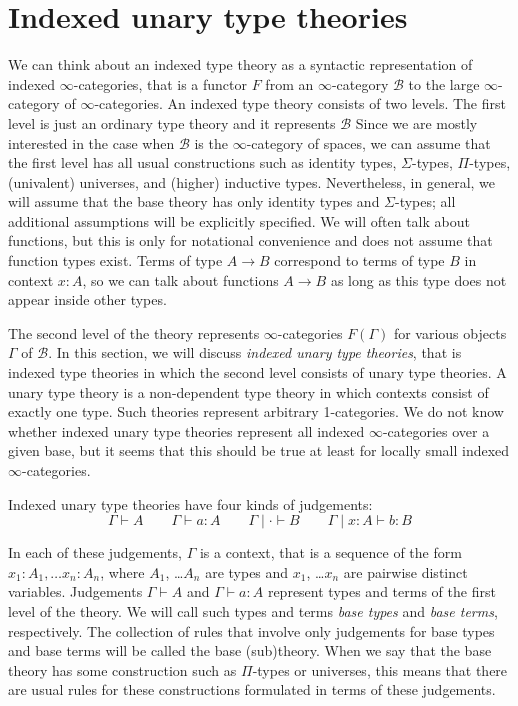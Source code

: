 \documentclass[reqno]{amsart}
\theoremstyle{definition}
\theoremstyle{remark}
\newcommand{\type}{}
\newcommand{\ob}{}
\numberwithin{figure}{section}
\begin{document}


\section{Indexed unary type theories}

We can think about an indexed type theory as a syntactic representation of indexed $\infty$-categories, that is a functor $F$ from an $\infty$-category $\mathcal{B}$ to the large $\infty$-category of $\infty$-categories.
An indexed type theory consists of two levels.
The first level is just an ordinary type theory and it represents $\mathcal{B}$
Since we are mostly interested in the case when $\mathcal{B}$ is the $\infty$-category of spaces,
we can assume that the first level has all usual constructions such as identity types, $\Sigma$-types, $\Pi$-types, (univalent) universes, and (higher) inductive types.
Nevertheless, in general, we will assume that the base theory has only identity types and $\Sigma$-types; all additional assumptions will be explicitly specified.
We will often talk about functions, but this is only for notational convenience and does not assume that function types exist.
Terms of type $A \to B$ correspond to terms of type $B$ in context $x : A$, so we can talk about functions $A \to B$ as long as this type does not appear inside other types.

The second level of the theory represents $\infty$-categories $F(\Gamma)$ for various objects $\Gamma$ of $\mathcal{B}$.
In this section, we will discuss \emph{indexed unary type theories}, that is indexed type theories in which the second level consists of unary type theories.
A unary type theory is a non-dependent type theory in which contexts consist of exactly one type.
Such theories represent arbitrary 1-categories.
We do not know whether indexed unary type theories represent all indexed $\infty$-categories over a given base, but it seems that this should be true at least for locally small indexed $\infty$-categories.

Indexed unary type theories have four kinds of judgements:
\[ \Gamma \vdash A \type \qquad \Gamma \vdash a : A \qquad \Gamma \mid \cdot \vdash B \ob \qquad \Gamma \mid x : A \vdash b : B \]

In each of these judgements, $\Gamma$ is a context, that is a sequence of the form $x_1 : A_1, \ldots x_n : A_n$, where $A_1$, \ldots $A_n$ are types and $x_1$, \ldots $x_n$ are pairwise distinct variables.
Judgements $\Gamma \vdash A \type$ and $\Gamma \vdash a : A$ represent types and terms of the first level of the theory.
We will call such types and terms \emph{base types} and \emph{base terms}, respectively.
The collection of rules that involve only judgements for base types and base terms will be called the base (sub)theory.
When we say that the base theory has some construction such as $\Pi$-types or universes, this means that there are usual rules for these constructions formulated in terms of these judgements.
\end{document}
